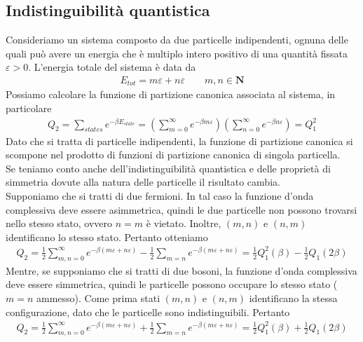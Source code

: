 \documentclass{article}
\begin{document}
\subsection{Indistinguibilità quantistica}
Consideriamo un sistema composto da due particelle indipendenti, ognuna delle quali può avere un energia che è multiplo intero positivo di una quantità fissata $\varepsilon > 0$. L'energia totale del sistema è data da
\begin{align}
    E_{tot} = m\varepsilon + n\varepsilon \qquad m, n \in \mathbf{N} \tag{4.1.1}
\end{align}
Possiamo calcolare la funzione di partizione canonica associata al sistema, in particolare
\begin{align}
    Q_2 = \sum_{states} e^{-\beta E_{state}} = \left(\sum_{m = 0}^\infty e^{-\beta m \varepsilon}\right)\left(\sum_{n = 0}^\infty e^{-\beta n \varepsilon}\right) = Q^2_1 \tag{4.1.2}
\end{align}
Dato che si tratta di particelle indipendenti, la funzione di partizione canonica si scompone nel prodotto di funzioni di partizione canonica di singola particella. \\
Se teniamo conto anche dell'indistinguibilità quantistica e delle proprietà di simmetria dovute alla natura delle particelle il risultato cambia. \\
Supponiamo che si tratti di due fermioni. In tal caso la funzione d'onda complessiva deve essere asimmetrica, quindi le due particelle non possono trovarsi nello stesso stato, ovvero $n = m$ è vietato. Inoltre, $(m, n)$ e $(n, m)$ identificano lo stesso stato. Pertanto otteniamo
\begin{align}
    Q_2 = \frac{1}{2}\sum_{m, n = 0}^\infty e^{-\beta(m\varepsilon + n\varepsilon)} - \frac{1}{2}\sum_{m = n}e^{-\beta(m\varepsilon + n\varepsilon)} = \frac{1}{2}Q^2_1(\beta) - \frac{1}{2}Q_1(2\beta) \tag{4.1.3}
\end{align}
Mentre, se supponiamo che si tratti di due bosoni, la funzione d'onda complessiva deve essere simmetrica, quindi le particelle possono occupare lo stesso stato ($m = n$ ammesso). Come prima stati $(m, n)$ e $(n, m)$ identificano la stessa configurazione, dato che le particelle sono indistinguibili. Pertanto 
\begin{align}
    Q_2 = \frac{1}{2}\sum_{m, n = 0}^\infty e^{-\beta(m\varepsilon + n\varepsilon)} + \frac{1}{2}\sum_{m = n}e^{-\beta(m\varepsilon + n\varepsilon)} = \frac{1}{2}Q^2_1(\beta) + \frac{1}{2}Q_1(2\beta) \tag{4.1.4}
\end{align}
\end{document}
